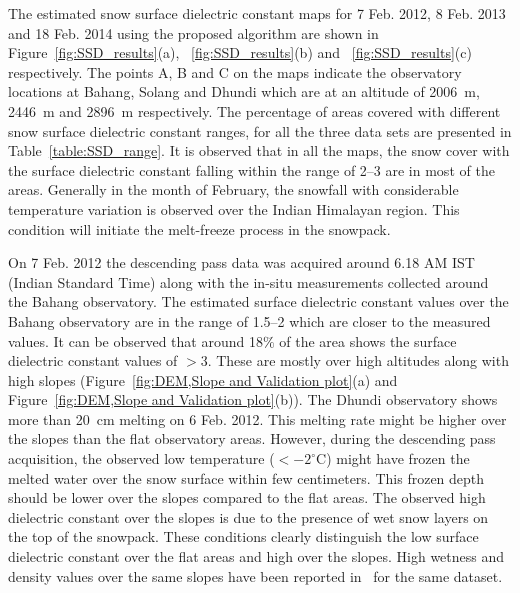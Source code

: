 The estimated snow surface dielectric constant maps for 7 Feb. 2012, 8 Feb. 2013 and 18 Feb. 2014 using the proposed algorithm are shown in Figure~\ref{fig:SSD_results}(a), ~\ref{fig:SSD_results}(b) and ~\ref{fig:SSD_results}(c) respectively. The points A, B and C on the maps indicate the observatory locations at Bahang, Solang and Dhundi which are at an altitude of 2006~m, 2446~m and 2896~m respectively. The percentage of areas covered with different snow surface dielectric constant ranges, for all the three data sets are presented in Table~\ref{table:SSD_range}. It is observed that in all the maps, the snow cover with the surface dielectric constant falling within the range of 2--3 are in most of the areas. Generally in the month of February, the snowfall with considerable temperature variation is observed over the Indian Himalayan region. This condition will initiate the melt-freeze process in the snowpack. 

On 7 Feb. 2012 the descending pass data was acquired around 6.18 AM IST (Indian Standard Time) along with the in-situ measurements collected around the Bahang observatory. The estimated surface dielectric constant values over the Bahang observatory are in the range of 1.5--2 which are closer to the measured values. It can be observed that around 18$\%$ of the area shows the surface dielectric constant values of $>$3. These are mostly over high altitudes along with high slopes (Figure~\ref{fig:DEM,Slope and Validation plot}(a) and Figure~\ref{fig:DEM,Slope and Validation plot}(b)). The Dhundi observatory shows more than 20~cm melting on 6 Feb. 2012. This melting rate might be higher over the slopes than the flat observatory areas. However, during the descending pass acquisition, the observed low temperature ($<-2^\circ$C) might have frozen the melted water over the snow surface within few centimeters. This frozen depth should be lower over the slopes compared to the flat areas. The observed high dielectric constant over the slopes is due to the presence of wet snow layers on the top of the snowpack. These conditions clearly distinguish the low surface dielectric constant over the flat areas and high over the slopes. High wetness and density values over the same slopes have been reported in~\cite{surendar2015snowwetness,surendar2015snowdensity} for the same dataset.

